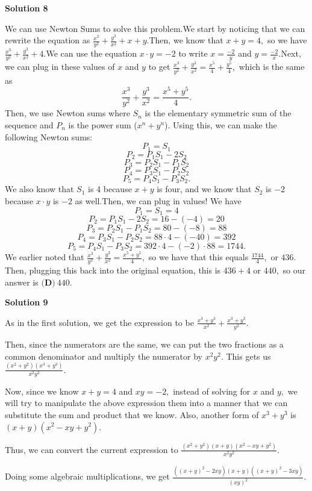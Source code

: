 \begin{enumerate}
 



\textbf{Solution 8}

We can use Newton Sums to solve this problem.We start by noticing that we can rewrite the equation as $\frac{x^3}{y^2} + \frac{y^3}{x^2} + x + y.$Then, we know that $x + y = 4,$ so we have $\frac{x^3}{y^2} + \frac{y^3}{x^2} + 4.$We can use the equation $x \cdot y = -2$ to write $x = \frac{-2}{y}$ and $y = \frac{-2}{x}.$Next, we can plug in these values of $x$ and $y$ to get $\frac{x^3}{y^2} + \frac{y^3}{x^2} = \frac{x^5}{4} + \frac{y^5}{4},$ which is the same as 
 \[\frac{x^3}{y^2} + \frac{y^3}{x^2} = \frac{x^5 + y^5}{4}.\]Then, we use Newton sums where $S_n$ is the elementary symmetric sum of the sequence and $P_n$ is the power sum ($x^n + y^n$). Using this, we can make the following Newton sums:
 \[P_1 = S_1\]
 \[P_2 = P_1 S_1 - 2S_2\]
 \[P_3 = P_2 S_1 - P_1 S_2\]
 \[P_4 = P_3 S_1 - P_2 S_2\]
 \[P_5 = P_4 S_1 - P_3 S_2.\]We also know that $S_1$ is 4 because $x + y$ is four, and we know that $S_2$ is $-2$ because $x \cdot y$ is $-2$ as well.Then, we can plug in values! We have
 \[P_1 = S_1 = 4\]
 \[P_2 = P_1 S_1 - 2S_2 = 16 - (-4) = 20\]
 \[P_3 = P_2 S_1 - P_1 S_2 = 80 - (-8) = 88\]
 \[P_4 = P_3 S_1 - P_2 S_2 = 88 \cdot 4 - (-40) = 392\]
 \[P_5 = P_4 S_1 - P_3 S_2 = 392 \cdot 4 - (-2) \cdot 88 = 1744.\]We earlier noted that $\frac{x^3}{y^2} + \frac{y^3}{x^2} = \frac{x^5 + y^5}{4},$ so we have that this equals $\frac{1744}{4},$ or $436.$ Then, plugging this back into the original equation, this is $436 + 4$ or $440,$ so our answer is $\boxed{\textbf{(D)}\ 440}.$




\textbf{Solution 9}

As in the first solution, we get the expression to be $\frac{x^3+y^3}{x^2} + \frac{x^3+y^3}{y^2}.$

 Then, since the numerators are the same, we can put the two fractions as a common denominator and multiply the numerator by $x^2y^2.$ This gets us $\frac{(x^2 + y^2)(x^3 + y^3)}{x^2y^2}.$

 Now, since we know $x+y=4$ and $xy=-2,$ instead of solving for $x$ and $y,$ we will try to manipulate the above expression them into a manner that we can substitute the sum and product that we know. Also, another form of $x^3+y^3$ is $(x+y)(x^2-xy+y^2).$

 Thus, we can convert the current expression to $\frac{(x^2 + y^2)(x+y)(x^2-xy+y^2)}{x^2y^2}.$

 Doing some algebraic multiplications, we get $\frac{((x+y)^2 - 2xy)(x+y)((x+y)^2 - 3xy)}{(xy)^2}.$


\end{enumerate}
